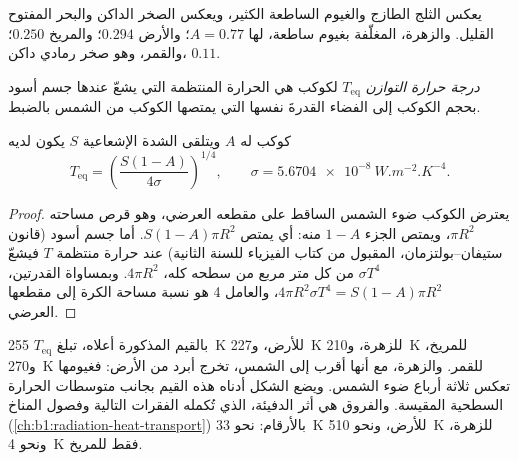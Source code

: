 يعكس الثلج الطازج والغيوم الساطعة الكثير، ويعكس الصخر الداكن والبحر المفتوح القليل. والزهرة، المغلّفة بغيوم ساطعة، لها $A = 0.77$؛ والأرض $0.294$؛ والمريخ $0.250$؛ والقمر، وهو صخر رمادي داكن، $0.11$.

\begin{definition}\label{def:b1:comparative-planetology:equilibrium-temperature}
\emph{درجة حرارة التوازن} $T_\mathrm{eq}$ لكوكب هي الحرارة المنتظمة التي يشعّ عندها جسم أسود بحجم الكوكب إلى الفضاء القدرةَ نفسها التي يمتصها الكوكب من الشمس بالضبط.
\end{definition}

\begin{proposition}\label{prop:b1:comparative-planetology:teq}
كوكب له  $A$ ويتلقى الشدة الإشعاعية $S$ يكون لديه
\[
  T_\mathrm{eq} = \left(\frac{S(1 - A)}{4\sigma}\right)^{1/4},
  \qquad \sigma = \qty{5.6704e-8}{W.m^{-2}.K^{-4}} .
\]
\end{proposition}

\begin{proof}
يعترض الكوكب ضوء الشمس الساقط على مقطعه العرضي، وهو قرص مساحته $\pi R^2$، ويمتص الجزء $1 - A$ منه: أي يمتص $S(1 - A)\pi
R^2$. أما جسم أسود (قانون ستيفان–بولتزمان، المقبول من كتاب الفيزياء للسنة الثانية) عند حرارة منتظمة $T$ فيشعّ $\sigma T^4$ من كل متر مربع من سطحه كله، $4\pi R^2$. وبمساواة القدرتين، $4\pi R^2\sigma T^4 = S(1 - A)\pi R^2$، والعامل 4 هو نسبة مساحة الكرة إلى مقطعها العرضي.
\end{proof}

بالقيم المذكورة أعلاه، تبلغ $T_\mathrm{eq}$ \qty{255}{K} للأرض، و\qty{227}{K} للزهرة، و\qty{210}{K} للمريخ، و\qty{270}{K} للقمر. والزهرة، مع أنها أقرب إلى الشمس، تخرج أبرد من الأرض: فغيومها تعكس ثلاثة أرباع ضوء الشمس. ويضع الشكل أدناه هذه القيم بجانب متوسطات الحرارة السطحية المقيسة. والفروق هي أثر الدفيئة، الذي تُكمله الفقرات التالية وفصول المناخ (\cref{ch:b1:radiation-heat-transport}) بالأرقام: نحو \qty{33}{K} للأرض، ونحو \qty{510}{K} للزهرة، ونحو \qty{4}{K} فقط للمريخ.

